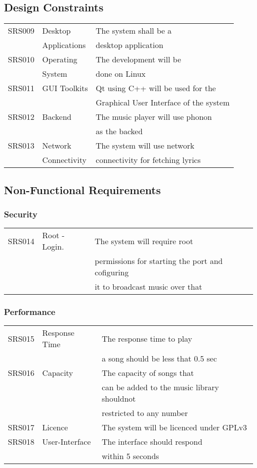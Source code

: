 \subsection{Design Constraints}
\begin{tabular}{ll|l}
	SRS009 & Desktop & The system shall be a \\
	~ & Applications & desktop application \\
	SRS010 & Operating & The development will be  \\
	~ & System & done on Linux \\
	SRS011 & GUI Toolkits & Qt using C++ will be used for the \\
	~ & ~ & Graphical User Interface of the system \\
	SRS012 & Backend & The music player will use phonon \\
	~ & ~ & as the backed \\
	SRS013 & Network  & The system will use network \\
	~ & Connectivity & connectivity for fetching lyrics \\

\end{tabular}
\subsection{Non-Functional Requirements}
\subsubsection{Security}
\begin{tabular}{ll|l}
	SRS014 & Root - Login. & The system will require root \\
	~ & ~ & permissions for starting the port and cofiguring \\
	~ & ~ & it to broadcast music over that
\end{tabular}
\subsubsection{Performance}
\begin{tabular}{ll|l}
	SRS015 & Response Time & The response time to play \\
	~ & ~ &  a song should be less that 0.5 sec \\
	SRS016 & Capacity & The capacity of songs that \\
	~ & ~ & can be added to the music library shouldnot\\
	~ & ~ & restricted to any number\\
	SRS017 & Licence & The system will be licenced under GPLv3 \\
	SRS018 & User-Interface & The interface should respond\\
	~ & ~ & within 5 seconds
\end{tabular}
